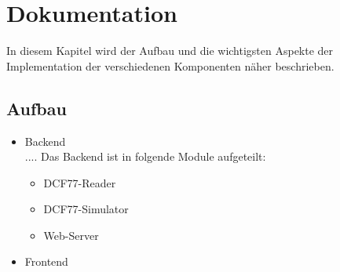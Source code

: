 
\chapter{Dokumentation}
In diesem Kapitel wird der Aufbau und die wichtigsten Aspekte der Implementation der verschiedenen Komponenten näher beschrieben.

\section{Aufbau}
\begin{itemize}
\item {Backend}\\
....
Das Backend ist in folgende Module aufgeteilt:
\begin{itemize}
\item {DCF77-Reader}
\item {DCF77-Simulator}
\item {Web-Server}\\
\end{itemize} 
\item {Frontend}\\
\end{itemize}
